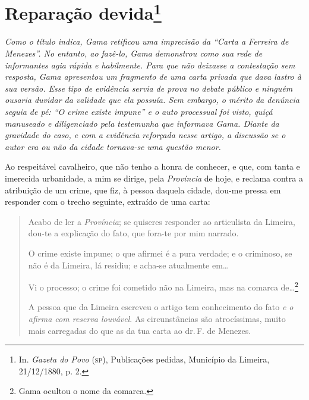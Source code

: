 \section{Reparação devida\protect\footnote{\MakeUppercase{I}n. \emph{\MakeUppercase{G}azeta do \MakeUppercase{P}ovo} (\textsc{sp}),
  \MakeUppercase{P}ublicações pedidas, \MakeUppercase{M}unicípio da \MakeUppercase{L}imeira, 21/12/1880, p. 2.}}

\begin{resumo}
\emph{Como o título indica, Gama retificou uma imprecisão da ``Carta a
Ferreira de Menezes''. No entanto, ao fazê-lo, Gama demonstrou como
sua rede de informantes agia rápida e habilmente. Para que não deixasse
a contestação sem resposta, Gama apresentou um fragmento de uma carta
privada que dava lastro à sua versão. Esse tipo de evidência servia de
prova no debate público e ninguém ousaria duvidar da validade que ela
possuía. Sem embargo, o mérito da denúncia seguia de pé: ``O crime existe
impune'' e o auto processual foi visto, quiçá manuseado e diligenciado
pela testemunha que informava Gama. Diante da gravidade do caso, e com a
evidência reforçada nesse artigo, a discussão se o autor era ou não da
cidade tornava-se uma questão menor. }
\end{resumo}

Ao respeitável cavalheiro, que não tenho a honra de conhecer, e que, com
tanta e imerecida urbanidade, a mim se dirige, pela \emph{Província} de
hoje, e reclama contra a atribuição de um crime, que fiz, à pessoa
daquela cidade, dou-me pressa em responder com o trecho seguinte,
extraído de uma carta:

\noindent\dotfill{}

\begin{quote}
Acabo de ler a \emph{Província}; se quiseres responder ao articulista
da Limeira, dou-te a explicação do fato, que fora-te por mim narrado.

O crime existe impune; o que afirmei é a pura verdade; e o criminoso, se
não é da Limeira, lá residiu; e acha-se atualmente em\ldots{}

Vi o processo; o crime foi cometido não na Limeira, mas na comarca
de\ldots{}\footnote{Gama ocultou o nome da comarca.}

A pessoa que da Limeira
escreveu o artigo tem conhecimento do fato \emph{e o afirma com reserva
louvável}. As circunstâncias são atrocíssimas, muito mais carregadas do
que as da tua carta ao dr.\,F. de Menezes.
\end{quote}

